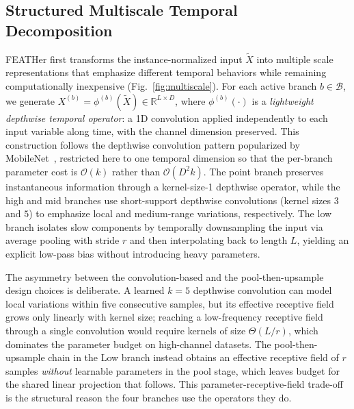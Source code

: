\documentclass[journal]{IEEEtran}
\theoremstyle{remark}
\begin{document}
\subsection{Structured Multiscale Temporal Decomposition}
\label{subsec:multiscale}
FEATHer first transforms the instance-normalized input $\widetilde X$
into multiple scale representations that emphasize different temporal
behaviors while remaining computationally inexpensive
(Fig.~\ref{fig:multiscale}). For each active branch
$b \in \mathcal{B}$, we generate
$X^{(b)} = \phi^{(b)}(\widetilde X) \in \mathbb{R}^{L \times D}$,
where $\phi^{(b)}(\cdot)$ is a \emph{lightweight depthwise temporal
operator}: a 1D convolution applied independently to each input
variable along time, with the channel dimension preserved. This
construction follows the depthwise convolution pattern popularized by
MobileNet~\cite{Howard2017MobileNets}, restricted here to one
temporal dimension so that the per-branch parameter cost is
$\mathcal{O}(k)$ rather than $\mathcal{O}(D^{2}k)$. The point branch preserves instantaneous
information through a kernel-size-1 depthwise operator, while the
high and mid branches use short-support depthwise convolutions
(kernel sizes $3$ and $5$) to emphasize local and medium-range
variations, respectively. The low branch isolates slow components by
temporally downsampling the input via average pooling with stride
$r$ and then interpolating back to length $L$, yielding an explicit
low-pass bias without introducing heavy parameters.

The asymmetry between the convolution-based and the
pool-then-upsample design choices is deliberate. A learned $k{=}5$
depthwise convolution can model local variations within five
consecutive samples, but its effective receptive field grows only
linearly with kernel size; reaching a low-frequency receptive field
through a single convolution would require kernels of size
$\Theta(L/r)$, which dominates the parameter budget on
high-channel datasets. The pool-then-upsample chain in the Low
branch instead obtains an effective receptive field of $r$ samples
\emph{without} learnable parameters in the pool stage, which leaves
budget for the shared linear projection that follows. This
parameter-receptive-field trade-off is the structural reason the
four branches use the operators they do.
\end{document}
